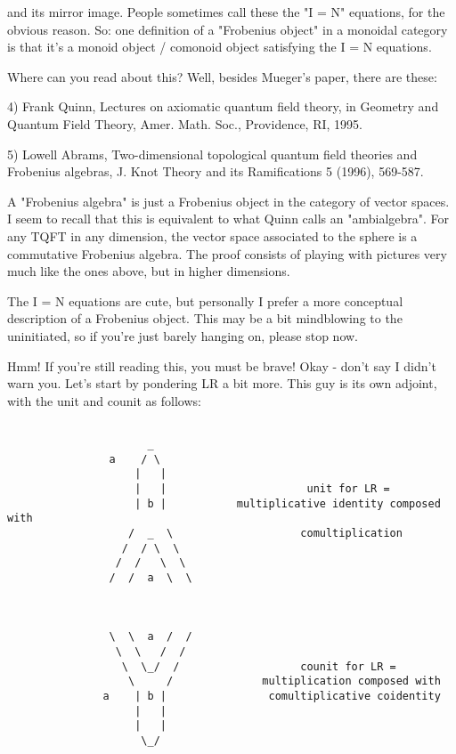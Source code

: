 and its mirror image.  People sometimes call these the "I = N"
equations, for the obvious reason.  So: one definition of a "Frobenius
object" in a monoidal category is that it's a monoid object / comonoid
object satisfying the I = N equations. 

Where can you read about this?  Well, besides Mueger's paper,
there are these:

4) Frank Quinn, Lectures on axiomatic quantum field theory, in 
Geometry and Quantum Field Theory, Amer. Math. Soc., Providence,
RI, 1995.  

5) Lowell Abrams, Two-dimensional topological quantum field theories
and Frobenius algebras, J. Knot Theory and its Ramifications 5 (1996),
569-587.

A "Frobenius algebra" is just a Frobenius object in the category
of vector spaces.  I seem to recall that this is equivalent to what
Quinn calls an "ambialgebra".  For any TQFT in any dimension, the 
vector space associated to the sphere is a commutative Frobenius
algebra.  The proof consists of playing with pictures very much 
like the ones above, but in higher dimensions.

The I = N equations are cute, but personally I prefer a more conceptual
description of a Frobenius object.  This may be a bit mindblowing to the
uninitiated, so if you're just barely hanging on, please stop now.

Hmm!  If you're still reading this, you must be brave!  Okay - don't
say I didn't warn you.  Let's start by pondering LR a bit more.  
This guy is its own adjoint, with the unit and counit as follows:


\begin{verbatim}

                      _
                a    / \      
                    |   |                     
                    |   |                      unit for LR =
                    | b |           multiplicative identity composed with
                   /  _  \                    comultiplication                
                  /  / \  \
                 /  /   \  \
                /  /  a  \  \



                \  \  a  /  /
                 \  \   /  /                 
                  \  \_/  /                   counit for LR =
                   \     /              multiplication composed with 
               a    | b |                comultiplicative coidentity
                    |   |
                    |   |
                     \_/
\end{verbatim}
    
